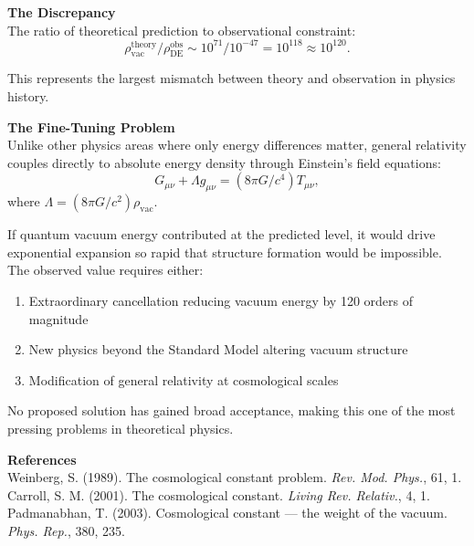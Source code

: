 \begin{technical}
\medskip

\noindent\textbf{The Discrepancy}\\
The ratio of theoretical prediction to observational constraint:
\begin{equation}
\rho_{\text{vac}}^{\text{theory}}/\rho_{\text{DE}}^{\text{obs}} \sim 10^{71}/10^{-47} = 10^{118} \approx 10^{120}.
\end{equation}

This represents the largest mismatch between theory and observation in physics history.

\medskip

\noindent\textbf{The Fine-Tuning Problem}\\
Unlike other physics areas where only energy differences matter, general relativity couples directly to absolute energy density through Einstein's field equations:
\begin{equation}
G_{\mu\nu} + \Lambda g_{\mu\nu} = (8\pi G/c^4) T_{\mu\nu},
\end{equation}
where $\Lambda = (8\pi G/c^2) \rho_{\text{vac}}$.

If quantum vacuum energy contributed at the predicted level, it would drive exponential expansion so rapid that structure formation would be impossible. The observed value requires either:

\begin{enumerate}
\item Extraordinary cancellation reducing vacuum energy by 120 orders of magnitude
\item New physics beyond the Standard Model altering vacuum structure
\item Modification of general relativity at cosmological scales
\end{enumerate}

No proposed solution has gained broad acceptance, making this one of the most pressing problems in theoretical physics.

\medskip

\noindent\textbf{References} \\
Weinberg, S. (1989). The cosmological constant problem. \textit{Rev. Mod. Phys.}, 61, 1.\\
Carroll, S. M. (2001). The cosmological constant. \textit{Living Rev. Relativ.}, 4, 1.\\
Padmanabhan, T. (2003). Cosmological constant — the weight of the vacuum. \textit{Phys. Rep.}, 380, 235.
\end{technical}
